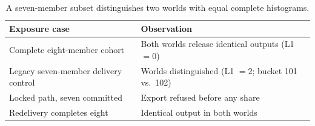 \begin{table}[t]
\centering
\caption{A seven-member subset distinguishes two worlds with equal complete histograms.}
\label{tab:cohort-selection}
\footnotesize
\begin{tabularx}{\columnwidth}{@{}lY@{}}
\toprule
Exposure case & Observation \\
\midrule
Complete eight-member cohort & Both worlds release identical outputs (L1 \(=0\)) \\
Legacy seven-member delivery control & Worlds distinguished (L1 \(=2\); bucket 101 vs.\ 102) \\
Locked path, seven committed & Export refused before any share \\
Redelivery completes eight & Identical output in both worlds \\
\bottomrule
\end{tabularx}
\end{table}
